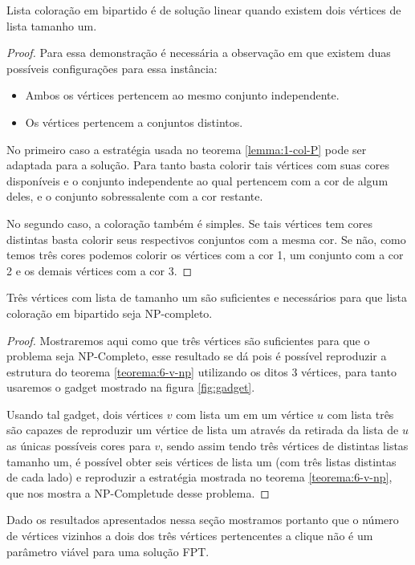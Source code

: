 \begin{teorema}
 Lista coloração em bipartido é de solução linear quando existem dois vértices de lista tamanho um.
\end{teorema}
\begin{proof}
 Para essa demonstração é necessária a observação em que existem duas possíveis configurações para essa instância:
 \begin{itemize}
   \item Ambos os vértices pertencem ao mesmo conjunto independente.
   \item Os vértices pertencem a conjuntos distintos.
 \end{itemize} 
 No primeiro caso a estratégia usada no teorema \ref{lemma:1-col-P} pode ser adaptada para a solução. Para tanto basta colorir tais vértices com suas cores disponíveis e o conjunto independente ao qual pertencem com a cor de algum deles, e o conjunto sobressalente com a cor restante.
 
 No segundo caso, a coloração também é simples. Se tais vértices tem cores distintas basta colorir seus respectivos conjuntos com a mesma cor. Se não, como temos três cores podemos colorir os vértices com a cor 1, um conjunto com a cor 2 e os demais vértices com a cor 3.  
\end{proof}

\begin{teorema}
  Três vértices com lista de tamanho um são suficientes e necessários para que lista coloração em bipartido seja NP-completo.
\end{teorema}
\begin{proof}
  Mostraremos aqui como que três vértices são suficientes para que o problema seja NP-Completo, esse resultado se dá pois é possível reproduzir a estrutura do teorema \ref{teorema:6-v-np} utilizando os ditos 3 vértices, para tanto usaremos o gadget mostrado na figura \ref{fig:gadget}.

Usando tal gadget, dois vértices $v$ com lista um em um vértice $u$ com lista três são capazes de reproduzir um vértice de lista um através da retirada da lista de $u$ as únicas possíveis cores para $v$, sendo assim tendo três vértices de distintas listas tamanho um, é possível obter seis vértices de lista um (com três listas distintas de cada lado) e reproduzir a estratégia mostrada no teorema \ref{teorema:6-v-np}, que nos mostra a NP-Completude desse problema.
  
\end{proof}
 Dado os resultados apresentados nessa seção mostramos portanto que o número de vértices vizinhos a dois dos três vértices pertencentes a clique não é um parâmetro viável para uma solução FPT.
  
